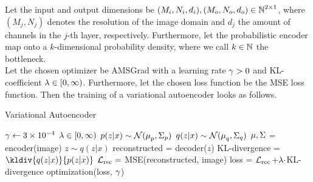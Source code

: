 \begin{algorithm}
Let the input and output dimensions be $(M_i,N_i, d_i), (M_o,N_o,d_o) \in \operatorname{\mathbb{N}}^{2\times 1}$, where $(M_j, N_j)$ denotes the resolution of the image domain and $d_j$ the amount of channels in the $j$-th layer, respectively. Furthermore, let the probabilistic encoder map onto a $k$-dimensional probability density, where we call $k\in\operatorname{\mathbb{N}}$ the bottleneck.\\
Let the chosen optimizer be AMSGrad with a learning rate $\operatorname{\gamma}>0$ and KL-coefficient $\lambda\in[0,\infty)$. Furthermore, let the chosen loss function be the MSE loss function. Then the training of a variational autoencoder looks as follows.
\caption{Variational Autoencoder}\label{alg:general_vae}
\begin{algorithmic}[1]
\Require $\operatorname{\gamma} \gets \num{3e-4}$ 
\Require $\lambda \in [0,\infty)$ 
\Require $p(z|x) \sim \mathcal{N}(\operatorname{\mu}_p,\Sigma_p)$ 
\Require $q(z|x) \sim \mathcal{N}(\operatorname{\mu}_q,\Sigma_q)$ 
	    \State $\operatorname{\mu}, \Sigma$ = encoder(image) 
	    \State $z\sim q(z|x)$ 
		\State reconstructed = decoder($z$) 
    	\State KL-divergence = $\kldiv{q(z|x)}{p(z|x)}$ 
    	\State $\operatorname{\mathcal{L}}_{\text{rec}} = $ MSE(reconstructed, image) 
    	\State loss = $\operatorname{\mathcal{L}}_{\text{rec}} + \lambda\cdot$KL-divergence 
	    \State optimization(loss, $\operatorname{\gamma}$) 
    \EndFor
\EndFor
\end{algorithmic}
\end{algorithm}

